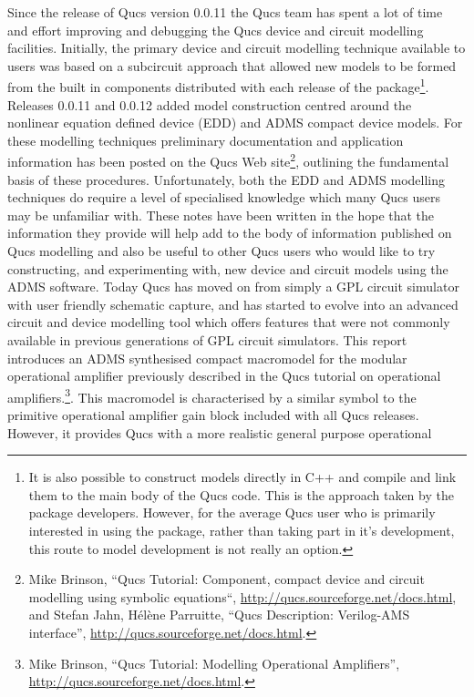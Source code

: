 Since the release of Qucs version 0.0.11 the Qucs team has spent a lot
of time and effort improving and debugging the Qucs device and circuit
modelling facilities. Initially, the primary device and circuit
modelling technique available to users was based on a subcircuit
approach that allowed new models to be formed from the built in
components distributed with each release of the package\footnote{It is
also possible to construct models directly in C++ and compile and link
them to the main body of the Qucs code.  This is the approach taken by
the package developers.  However, for the average Qucs user who is
primarily interested in using the package, rather than taking part in
it's development, this route to model development is not really an
option.}.  Releases 0.0.11 and 0.0.12 added model construction centred
around the nonlinear equation defined device (EDD) and ADMS compact
device models.  For these modelling techniques preliminary
documentation and application information has been posted on the Qucs
Web site\footnote{Mike Brinson, ``Qucs Tutorial: Component, compact
device and circuit modelling using symbolic equations``,
\url{http://qucs.sourceforge.net/docs.html}, and Stefan Jahn, H\'{e}l\`{e}ne
Parruitte, ``Qucs Description: Verilog-AMS interface'',
\url{http://qucs.sourceforge.net/docs.html}.}, outlining the fundamental
basis of these procedures.  Unfortunately, both the EDD and ADMS
modelling techniques do require a level of specialised knowledge which
many Qucs users may be unfamiliar with. These notes have been written
in the hope that the information they provide will help add to the
body of information published on Qucs modelling and also be useful to
other Qucs users who would like to try constructing, and experimenting
with, new device and circuit models using the ADMS software. Today
Qucs has moved on from simply a GPL circuit simulator with user
friendly schematic capture, and has started to evolve into an advanced
circuit and device modelling tool which offers features that were not
commonly available in previous generations of GPL circuit simulators.
This report introduces an ADMS synthesised compact macromodel for the
modular operational amplifier previously described in the Qucs
tutorial on operational amplifiers.\footnote{Mike Brinson, ``Qucs
Tutorial: Modelling Operational Amplifiers'',
\url{http://qucs.sourceforge.net/docs.html}.}. This macromodel is
characterised by a similar symbol to the primitive operational
amplifier gain block included with all Qucs releases.  However, it
provides Qucs with a more realistic general purpose operational
